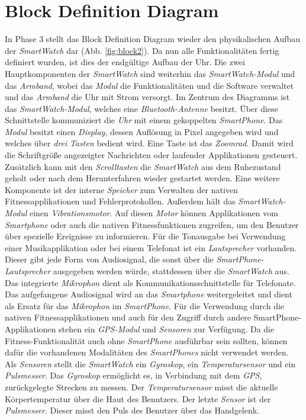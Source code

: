 \section{Block Definition Diagram}
In Phase 3 stellt das Block Definition Diagram wieder den physikalischen Aufbau der \textit{SmartWatch} dar (Abb. \ref{fig:block2}). Da nun alle Funktionalitäten fertig definiert wurden, ist dies der endgültige Aufbau der Uhr. Die zwei Hauptkomponenten der \textit{SmartWatch} sind weiterhin das \textit{SmartWatch-Modul} und das \textit{Armband}, wobei das \textit{Modul} die Funktionalitäten und die Software verwaltet und das \textit{Armband} die Uhr mit Strom versorgt. Im Zentrum des Diagramms ist das \textit{SmartWatch-Modul}, welches eine \textit{Bluetooth-Antenne} besitzt. Über diese Schnittstelle kommuniziert die \textit{Uhr} mit einem gekoppelten \textit{SmartPhone}. Das \textit{Modul} besitzt einen \textit{Display}, dessen Auflösung in Pixel angegeben wird und welches über \textit{drei} \textit{Tasten} bedient wird. Eine Taste ist das \textit{Zoomrad}. Damit wird die Schriftgröße angezeigter Nachrichten oder laufender Applikationen gesteuert. Zusätzlich kann mit den \textit{Scrolltasten} die \textit{SmartWatch} aus dem Ruhezustand geholt oder nach dem Herunterfahren wieder gestartet werden. Eine weitere Komponente ist der interne \textit{Speicher} zum Verwalten der nativen Fitnessapplikationen und Fehlerprotokollen. Außerdem hält das \textit{SmartWatch-Modul} einen \textit{Vibrationsmotor}. Auf diesen \textit{Motor} können Applikationen vom \textit{Smartphone} oder auch die nativen Fitnessfunktionen zugreifen, um den Benutzer über spezielle Ereignisse zu informieren. Für die Tonausgabe bei Verwendung einer Musikapplikation oder bei einem Telefonat ist ein \textit{Lautsprecher} vorhanden. Dieser gibt jede Form von Audiosignal, die sonst über die \textit{SmartPhone-Lautsprecher} ausgegeben werden würde, stattdessen über die \textit{SmartWatch} aus. Das integrierte \textit{Mikrophon} dient als Kommunikationsschnittstelle für Telefonate. Das aufgefangene Audiosignal wird an das \textit{Smartphone} weitergeleitet und dient als Ersatz für das \textit{Mikrophon} im \textit{SmartPhone}. Für die Verwendung durch die nativen Fitnessapplikationen und auch für den Zugriff durch andere SmartPhone-Applikationen stehen ein \textit{GPS-Modul} und \textit{Sensoren} zur Verfügung. Da die Fitness-Funktionalität auch ohne \textit{SmartPhone} ausführbar sein sollten, können dafür die vorhandenen Modalitäten des \textit{SmartPhones} nicht verwendet werden. Als \textit{Sensoren} stellt die \textit{SmartWatch} ein \textit{Gyroskop}, ein \textit{Temperatursensor} und ein \textit{Pulsmesser}. Das \textit{Gyroskop} ermöglicht es, in Verbindung mit dem \textit{GPS}, zurückgelegte Strecken zu messen. Der \textit{Temperatursensor} misst die aktuelle Körpertemperatur über die Haut des Benutzers. Der letzte \textit{Sensor} ist der \textit{Pulsmesser}. Dieser misst den Puls des Benutzer über das Handgelenk.\\
